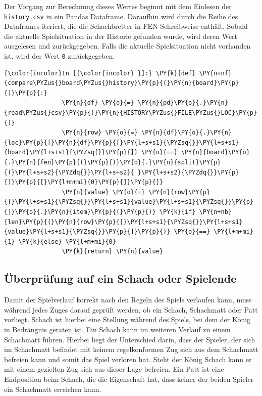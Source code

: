 Der Vorgang zur Berechnung dieses Wertes beginnt mit dem Einlesen der
\texttt{history.csv} in ein Pandas Dataframe. Daraufhin wird durch die
Reihe des Dataframes iteriert, die die Schachbretter in FEN-Schreibweise
enthält. Sobald die aktuelle Spielsituation in der Historie gefunden
wurde, wird deren Wert ausgelesen und zurückgegeben. Falls die aktuelle
Spielsituation nicht vorhanden ist, wird der Wert \texttt{0}
zurückgegeben.

    \begin{Verbatim}[commandchars=\\\{\}]
{\color{incolor}In [{\color{incolor} }]:} \PY{k}{def} \PY{n+nf}{compare\PYZus{}board\PYZus{}history}\PY{p}{(}\PY{n}{board}\PY{p}{)}\PY{p}{:}
                \PY{n}{df} \PY{o}{=} \PY{n}{pd}\PY{o}{.}\PY{n}{read\PYZus{}csv}\PY{p}{(}\PY{n}{HISTORY\PYZus{}FILE\PYZus{}LOC}\PY{p}{)}
                \PY{n}{row} \PY{o}{=} \PY{n}{df}\PY{o}{.}\PY{n}{loc}\PY{p}{[}\PY{n}{df}\PY{p}{[}\PY{l+s+s1}{\PYZsq{}}\PY{l+s+s1}{board}\PY{l+s+s1}{\PYZsq{}}\PY{p}{]} \PY{o}{==} \PY{n}{board}\PY{o}{.}\PY{n}{fen}\PY{p}{(}\PY{p}{)}\PY{o}{.}\PY{n}{split}\PY{p}{(}\PY{l+s+s2}{\PYZdq{}}\PY{l+s+s2}{ }\PY{l+s+s2}{\PYZdq{}}\PY{p}{)}\PY{p}{[}\PY{l+m+mi}{0}\PY{p}{]}\PY{p}{]}
                \PY{n}{value} \PY{o}{=} \PY{n}{row}\PY{p}{[}\PY{l+s+s1}{\PYZsq{}}\PY{l+s+s1}{value}\PY{l+s+s1}{\PYZsq{}}\PY{p}{]}\PY{o}{.}\PY{n}{item}\PY{p}{(}\PY{p}{)} \PY{k}{if} \PY{n+nb}{len}\PY{p}{(}\PY{n}{row}\PY{p}{[}\PY{l+s+s1}{\PYZsq{}}\PY{l+s+s1}{value}\PY{l+s+s1}{\PYZsq{}}\PY{p}{]}\PY{p}{)} \PY{o}{==} \PY{l+m+mi}{1} \PY{k}{else} \PY{l+m+mi}{0}
                \PY{k}{return} \PY{n}{value}
\end{Verbatim}


    \subsection{Überprüfung auf ein Schach oder
Spielende}\label{uxfcberpruxfcfung-auf-ein-schach-oder-spielende}

Damit der Spielverlauf korrekt nach den Regeln des Spiels verlaufen
kann, muss während jedes Zuges darauf geprüft werden, ob ein Schach,
Schachmatt oder Patt vorliegt. Schach ist hierbei eine Stellung während
des Spiels, bei dem der König in Bedrängnis geraten ist. Ein Schach kann
im weiteren Verlauf zu einem Schachmatt führen. Hierbei liegt der
Unterschied darin, dass der Spieler, der sich im Schachmatt befindet mit
keinem regelkonformen Zug sich aus dem Schachmatt befreien kann und
somit das Spiel verloren hat. Steht der König Schach kann er mit einem
gezielten Zug sich aus dieser Lage befreien. Ein Patt ist eine
Endposition beim Schach, die die Eigenschaft hat, dass keiner der beiden
Spieler ein Schachmatt erreichen kann.

